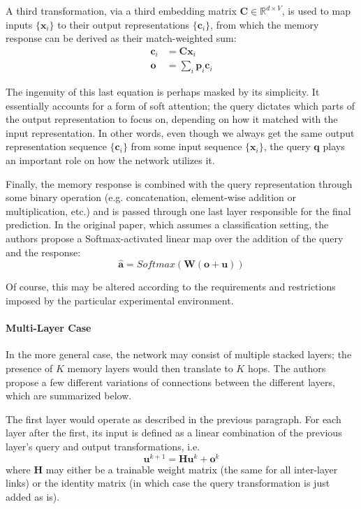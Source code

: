 \documentclass[]{article}
\begin{document}
A third transformation, via a third embedding matrix $\pmb{C} \in \mathbb{R}^{d\times V}$, is used to map inputs $\{\pmb{x}_i\}$ to their output representations $\{\pmb{c}_i\}$, from which the memory response can be derived as their match-weighted sum:
\begin{align}
\tag{Output Transformation}
\pmb{c}_i &= \pmb{C}\pmb{x}_i\\
\tag{Memory Response}
\pmb{o} &= \sum\limits_i{\pmb{p}_i\pmb{c}_i}
\end{align}

The ingenuity of this last equation is perhaps masked by its simplicity. It essentially accounts for a form of soft attention; the query dictates which parts of the output representation to focus on, depending on how it matched with the input representation. In other words, even though we always get the same output representation sequence $\{\pmb{c}_i\}$ from some input sequence $\{\pmb{x}_i\}$, the query $\pmb{q}$ plays an important role on how the network utilizes it.

Finally, the memory response is combined with the query representation through some binary operation (e.g. concatenation, element-wise addition or multiplication, etc.) and is passed through one last layer responsible for the final prediction. In the original paper, which assumes a classification setting, the authors propose a Softmax-activated linear map over the addition of the query and the response:
\[
\tag{Final Prediction}
\hat{\pmb{a}} = Softmax(\pmb{W} (\pmb{o}+\pmb{u}))
\]

Of course, this may be altered according to the requirements and restrictions imposed by the particular experimental environment. 

\paragraph{Multi-Layer Case}
In the more general case, the network may consist of multiple stacked layers; the presence of $K$ memory layers would then translate to $K$ hops. The authors propose a few different variations of connections between the different layers, which are summarized below. 

The first layer would operate as described in the previous paragraph. For each layer after the first, its input is defined as a linear combination of the previous layer's query and output transformations, i.e.
\[
\tag{Next Query Transformation}
\pmb{u}^{k+1} = \pmb{H}\pmb{u}^{k} + \pmb{o}^k 
\]
where $\pmb{H}$ may either be a trainable weight matrix (the same for all inter-layer links) or the identity matrix (in which case the query transformation is just added as is).
\end{document}
